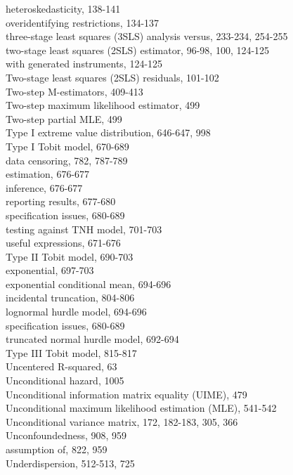 \documentclass[10pt]{article}
\begin{document}
heteroskedasticity, 138-141\\
overidentifying restrictions, 134-137\\
three-stage least squares (3SLS) analysis versus, 233-234, 254-255\\
two-stage least squares (2SLS) estimator, 96-98, 100, 124-125\\
with generated instruments, 124-125\\
Two-stage least squares (2SLS) residuals, 101-102\\
Two-step M-estimators, 409-413\\
Two-step maximum likelihood estimator, 499\\
Two-step partial MLE, 499\\
Type I extreme value distribution, 646-647, 998\\
Type I Tobit model, 670-689\\
data censoring, 782, 787-789\\
estimation, 676-677\\
inference, 676-677\\
reporting results, 677-680\\
specification issues, 680-689\\
testing against TNH model, 701-703\\
useful expressions, 671-676\\
Type II Tobit model, 690-703\\
exponential, 697-703\\
exponential conditional mean, 694-696\\
incidental truncation, 804-806\\
lognormal hurdle model, 694-696\\
specification issues, 680-689\\
truncated normal hurdle model, 692-694\\
Type III Tobit model, 815-817\\
Uncentered R-squared, 63\\
Unconditional hazard, 1005\\
Unconditional information matrix equality (UIME), 479\\
Unconditional maximum likelihood estimation (MLE), 541-542\\
Unconditional variance matrix, 172, 182-183, 305, 366\\
Unconfoundedness, 908, 959\\
assumption of, 822, 959\\
Underdispersion, 512-513, 725\\
\end{document}
